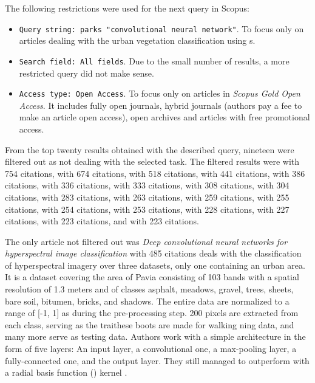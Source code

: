The following restrictions were used for the next query in Scopus:

\begin{itemize}
	\item \verb|Query string: parks "convolutional neural network"|. To fo\-cus on\-ly on articles dealing with the urban vegetation classification using s.
	\item \verb|Search field: All fields|. Due to the small number of results, a more restricted query did not make sense.
	\item \verb|Access type: Open Access|. To focus only on articles in \textit{Scopus Gold Open Access}. It includes fully open journals, hybrid journals (authors pay a fee to make an article open access), open archives and articles with free promotional access.
\end{itemize}

\noindent From the top twenty results obtained with the described query, nineteen were filtered out as not dealing with the selected task. The filtered results were \cite{dl-dna-rna} with 754 citations, \cite{lstm-activity} with 674 citations, \cite{visual-genome} with 518 citations, \cite{dl-computational-biology} with 441 citations, \cite{text-detection-imagery} with 386 citations, \cite{opportunities-biology-medicine} with 336 citations, \cite{neuromorphic-computing} with 333 citations, \cite{cnn-traffic} with 308 citations, \cite{dnn-plant-diseases} with 304 citations, \cite{dl-for-cv} with 283 citations, \cite{face-classification} with 263 citations, \cite{human-transcription-factors} with 259 citations, \cite{ecg-heartbeat} with 255 citations, \cite{ml-medical-imaging} with 254 citations, \cite{visual-question-answering} with 253 citations, \cite{soli} with 228 citations, \cite{cnn-neuromorphic-computing} with 227 citations, \cite{dl-fault-diagnosis} with 223 citations, and \cite{basset} with 223 citations.

The only article not filtered out was \textit{Deep convolutional neural networks for hyperspectral image classification} \cite{cnn-hs} with 485 citations deals with the classification of hyperspectral imagery over three datasets, only one containing an urban area. It is a dataset covering the area of Pavia consisting of 103 bands with a spatial resolution of 1.3 meters and of classes asphalt, meadows, gravel, trees, sheets, bare soil, bitumen, bricks, and shadows. The entire data are normalized to a range of [-1, 1] as during the pre-processing step. 200 pixels are extracted from each class, serving as the traithese boots are made for walking ning data, and many more serve as testing data. Authors work with a simple  architecture in the form of five layers: An input layer, a convolutional one, a max-pooling layer, a fully-connected one, and the output layer. They still managed to outperform  with a radial basis function () kernel \cite{rbf-kernel}.

